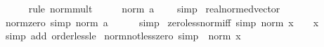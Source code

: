 \begin{isabellebody}
\ \ \ \ \isamarkupfalse%
\ {\isacharparenleft}{\kern0pt}rule\ norm{\isacharunderscore}{\kern0pt}mult{\isacharparenright}{\kern0pt}\isanewline
\ \ \isamarkupfalse%
\ \isamarkupfalse%
\ {\isachardoublequoteopen}norm\ {\isacharparenleft}{\kern0pt}{}{\isacharcolon}{\kern0pt}{\isacharcolon}{\kern0pt}{\isacharprime}{\kern0pt}a{\isacharparenright}{\kern0pt}\ {\isacharequal}{\kern0pt}\ {}{\isachardoublequoteclose}\ \isamarkupfalse%
\ simp\isanewline
{}\isamarkupfalse%
%
\endisatagproof
{\isafoldproof}%
%
\isadelimproof
\isanewline
%
\endisadelimproof
\isanewline
{}\isamarkupfalse%
\ real{\isacharunderscore}{\kern0pt}normed{\isacharunderscore}{\kern0pt}vector\ \isanewline
\isanewline
{}\isamarkupfalse%
\ norm{\isacharunderscore}{\kern0pt}zero\ {\isacharbrackleft}{\kern0pt}simp{\isacharbrackright}{\kern0pt}{\isacharcolon}{\kern0pt}\ {\isachardoublequoteopen}norm\ {\isacharparenleft}{\kern0pt}{}{\isacharcolon}{\kern0pt}{\isacharcolon}{\kern0pt}{\isacharprime}{\kern0pt}a{\isacharparenright}{\kern0pt}\ {\isacharequal}{\kern0pt}\ {}{\isachardoublequoteclose}\isanewline
%
\isadelimproof
\ \ %
\endisadelimproof
%
\isatagproof
{}\isamarkupfalse%
\ simp%
\endisatagproof
{\isafoldproof}%
%
\isadelimproof
\isanewline
%
\endisadelimproof
\isanewline
{}\isamarkupfalse%
\ zero{\isacharunderscore}{\kern0pt}less{\isacharunderscore}{\kern0pt}norm{\isacharunderscore}{\kern0pt}iff\ {\isacharbrackleft}{\kern0pt}simp{\isacharbrackright}{\kern0pt}{\isacharcolon}{\kern0pt}\ {\isachardoublequoteopen}norm\ x\ {\isachargreater}{\kern0pt}\ {}\ {\isasymlongleftrightarrow}\ x\ {\isasymnoteq}\ {}{\isachardoublequoteclose}\isanewline
%
\isadelimproof
\ \ %
\endisadelimproof
%
\isatagproof
{}\isamarkupfalse%
\ {\isacharparenleft}{\kern0pt}simp\ add{\isacharcolon}{\kern0pt}\ order{\isacharunderscore}{\kern0pt}less{\isacharunderscore}{\kern0pt}le{\isacharparenright}{\kern0pt}%
\endisatagproof
{\isafoldproof}%
%
\isadelimproof
\isanewline
%
\endisadelimproof
\isanewline
{}\isamarkupfalse%
\ norm{\isacharunderscore}{\kern0pt}not{\isacharunderscore}{\kern0pt}less{\isacharunderscore}{\kern0pt}zero\ {\isacharbrackleft}{\kern0pt}simp{\isacharbrackright}{\kern0pt}{\isacharcolon}{\kern0pt}\ {\isachardoublequoteopen}{\isasymnot}\ norm\ x\ {\isacharless}{\kern0pt}\ {}{\isachardoublequoteclose}\isanewline
%
\isadelimproof
\ \ %
\endisadelimproof

\end{isabellebody}
